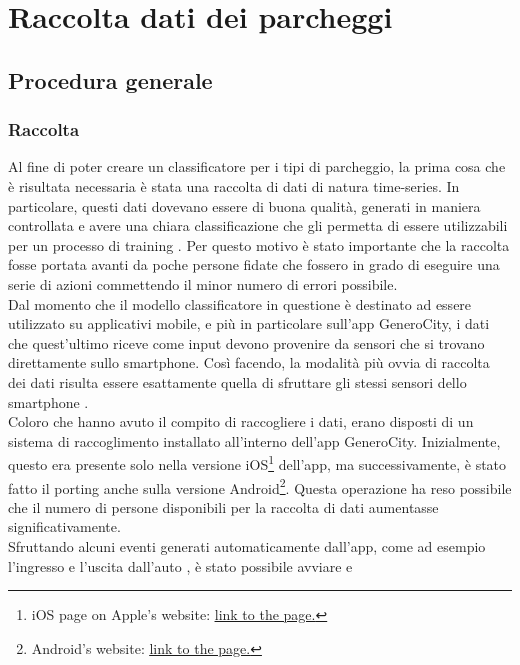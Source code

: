 \chapter{Raccolta dati dei parcheggi}
\section{Procedura generale} 

\subsection{Raccolta}
Al fine di poter creare un classificatore per i tipi di parcheggio, la prima cosa
che è risultata necessaria è stata una raccolta di dati di natura time-series. In particolare, questi dati
dovevano essere di buona qualità, generati in maniera controllata e avere una chiara
classificazione che gli permetta di essere utilizzabili per un processo di training
\cite{pattern_extraction_time_series}.
Per questo motivo è stato importante che la raccolta fosse portata
avanti da poche persone fidate che fossero in grado di eseguire una serie di azioni
commettendo il minor numero di errori possibile.\\
Dal momento che il modello classificatore in questione è destinato ad essere utilizzato
su applicativi mobile, e più in particolare sull'app GeneroCity, i dati che quest'ultimo
riceve come input devono provenire da sensori che si trovano direttamente sullo smartphone.
Così facendo, la modalità più ovvia di raccolta dei dati risulta essere esattamente 
quella di sfruttare gli stessi sensori dello smartphone
\cite{classification_smartphone_motion_sensors} \cite{driver_passenger_identification_smartphone}.\\
Coloro che hanno avuto il compito di raccogliere i dati, erano disposti di un sistema di
raccoglimento installato all'interno dell'app GeneroCity. Inizialmente, questo era presente
solo nella versione iOS\footnote{iOS page on Apple's website: 
\href{https://www.apple.com/ios}{\underline{link to the page.}}} dell'app, 
ma successivamente, è stato fatto il porting anche sulla
versione Android\footnote{Android's website: 
\href{https://www.android.com}{\underline{link to the page.}}}.
Questa operazione ha reso possibile che il numero di persone disponibili
per la raccolta di dati aumentasse significativamente.\\
Sfruttando alcuni eventi generati automaticamente dall'app, come ad esempio l'ingresso e
l'uscita dall'auto \cite{framework_user_experience_car}, è stato possibile avviare e 
